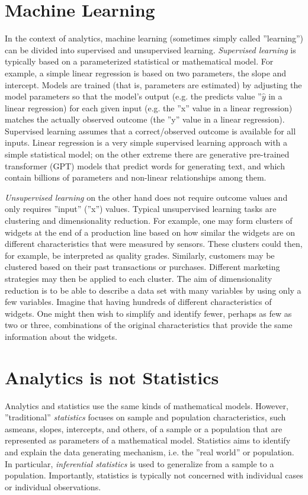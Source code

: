 \section{Machine Learning}

In the context of analytics, machine learning (sometimes simply called ''learning'') can be divided into supervised and unsupervised learning. \emph{Supervised learning} is typically based on a parameterized statistical or mathematical model. For example, a simple linear regression is based on two parameters, the slope and intercept. Models are trained (that is, parameters are estimated) by adjusting the model parameters so that the model's output (e.g. the predicts value ''$\hat{y}$ in a linear regression) for each given input (e.g. the ''x'' value in a linear regression) matches the actually observed outcome (the ''y'' value in a linear regression). Supervised learning assumes that a correct/observed outcome is available for all inputs. Linear regression is a very simple supervised learning approach with a simple statistical model; on the other extreme there are generative pre-trained transformer (GPT) models that predict words for generating text, and which contain billions of parameters and non-linear relationships among them.

\emph{Unsupervised learning} on the other hand does not require outcome values and only requires ''input'' (''x'') values. Typical unsupervised learning tasks are clustering and dimensionality reduction. For example, one may form clusters of widgets at the end of a production line based on how similar the widgets are on different characteristics that were measured by sensors. These clusters could then, for example, be interpreted as quality grades. Similarly, customers may be clustered based on their past transactions or purchases. Different marketing strategies may then be applied to each cluster. The aim of dimensionality reduction is to be able to describe a data set with many variables by using only a few variables. Imagine that having hundreds of different characteristics of widgets. One might then wish to simplify and identify fewer, perhaps as few as two or three, combinations of the original characteristics that provide the same information about the widgets.

\section{Analytics is not Statistics}

Analytics and statistics use the same kinds of mathematical models. However, ''traditional'' \emph{statistics} focuses on sample and population characteristics, such asmeans, slopes, intercepts, and others, of a sample or a population that are represented as parameters of a mathematical model. Statistics aims to identify and explain the data generating mechanism, i.e. the ''real world'' or population. In particular, \emph{inferential statistics} is used to generalize from a sample to a population. Importantly, statistics is typically not concerned with individual cases or individual observations.

